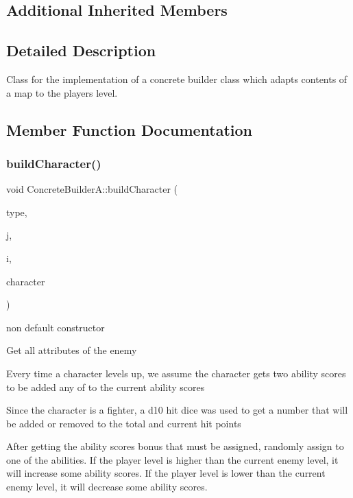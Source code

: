 \subsection*{Additional Inherited Members}


\subsection{Detailed Description}
Class for the implementation of a concrete builder class which adapts contents of a map to the player\textquotesingle{}s level. 

\subsection{Member Function Documentation}
\hypertarget{class_concrete_builder_a_ae442fa67468d68f65814f730e674af2d}{}\label{class_concrete_builder_a_ae442fa67468d68f65814f730e674af2d} 
\subsubsection{\texorpdfstring{build\+Character()}{buildCharacter()}}
{\footnotesize\ttfamily void Concrete\+Builder\+A\+::build\+Character (\begin{DoxyParamCaption}\item[{char}]{type,  }\item[{int}]{j,  }\item[{int}]{i,  }\item[{\hyperlink{class_map_object}{Map\+Object} $\ast$}]{character }\end{DoxyParamCaption})\hspace{0.3cm}{\ttfamily [virtual]}}



non default constructor 

Get all attributes of the enemy

Every time a character levels up, we assume the character gets two ability scores to be added any of to the current ability scores

Since the character is a fighter, a d10 hit dice was used to get a number that will be added or removed to the total and current hit points

After getting the ability scores bonus that must be assigned, randomly assign to one of the abilities. If the player level is higher than the current enemy level, it will increase some ability scores. If the player level is lower than the current enemy level, it will decrease some ability scores.

